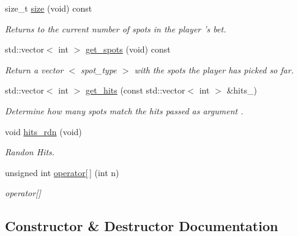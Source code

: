 \begin{DoxyCompactItemize}
size\+\_\+t \hyperlink{classKenoBet_aa6f65b35514270c2707e60b9dea23ae9}{size} (void) const
\begin{DoxyCompactList}\small\item\em Returns to the current number of spots in the player ’s bet. \end{DoxyCompactList}\item 
std\+::vector$<$ int $>$ \hyperlink{classKenoBet_a382454c66974466900d168c398699483}{get\+\_\+spots} (void) const
\begin{DoxyCompactList}\small\item\em Return a vector $<$ spot\+\_\+type $>$ with the spots the player has picked so far. \end{DoxyCompactList}\item 
std\+::vector$<$ int $>$ \hyperlink{classKenoBet_a612b57c35203a41682269cdfbb31c2b1}{get\+\_\+hits} (const std\+::vector$<$ int $>$ \&hits\+\_\+)
\begin{DoxyCompactList}\small\item\em Determine how many spots match the hits passed as argument . \end{DoxyCompactList}\item 
void \hyperlink{classKenoBet_aa2093fa2b053cf74e95d1e6b54d748f3}{hits\+\_\+rdn} (void)
\begin{DoxyCompactList}\small\item\em Randon Hits. \end{DoxyCompactList}\item 
unsigned int \hyperlink{classKenoBet_a5a544a0c1ba5872076e7bfdf8f935368}{operator\mbox{[}$\,$\mbox{]}} (int n)
\begin{DoxyCompactList}\small\item\em operator\mbox{[}\mbox{]} \end{DoxyCompactList}\end{DoxyCompactItemize}


\subsection{Constructor \& Destructor Documentation}
\mbox{\label{classKenoBet_a225e9428e2bc69acfd4fef3effdd4ccc}} 
